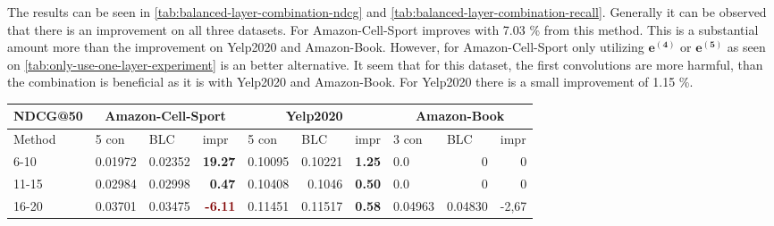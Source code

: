 The results can be seen in \autoref{tab:balanced-layer-combination-ndcg} and \autoref{tab:balanced-layer-combination-recall}.
Generally it can be observed that there is an improvement on all three datasets. %
For Amazon-Cell-Sport improves with 7.03 \% from this method.
This is a substantial amount more than the improvement on Yelp2020 and Amazon-Book.
However, for Amazon-Cell-Sport only utilizing $\mathbf{e^{(4)}}$ or $\mathbf{e^{(5)}}$ as seen on \autoref{tab:only-use-one-layer-experiment} is an better alternative.
It seem that for this dataset, the first convolutions are more harmful, than the combination is beneficial as it is with Yelp2020 and Amazon-Book.
For Yelp2020 there is a small improvement of 1.15 \%.

\begin{table*}[h!] %
    \centering
    \begin{tabular}{|l|r|r|r||l|r|r||l|l|l|}
        \hline
        NDCG@50 & \multicolumn{3}{c||}{Amazon-Cell-Sport} & \multicolumn{3}{c||}{Yelp2020} & \multicolumn{3}{c|}{Amazon-Book}                                                                                                                                                \\ \hline
        Method  & \multicolumn{1}{l|}{5 con}              & \multicolumn{1}{l|}{BLC}       & \multicolumn{1}{l||}{impr}             & 5 con   & \multicolumn{1}{l|}{BLC} & \multicolumn{1}{l||}{impr}            & 3 con   & BLC                    & impr                   \\ \hline
        6-10    & 0.01972                                 & 0.02352                        & \textbf{\textcolor{OliveGreen}{19.27}} & 0.10095 & 0.10221                  & \textbf{\textcolor{OliveGreen}{1.25}} & 0.0     & \multicolumn{1}{r|}{0} & \multicolumn{1}{r|}{0} \\ \hline
        11-15   & 0.02984                                 & 0.02998                        & \textbf{\textcolor{OliveGreen}{0.47}}  & 0.10408 & 0.1046                   & \textbf{\textcolor{OliveGreen}{0.50}} & 0.0     & \multicolumn{1}{r|}{0} & \multicolumn{1}{r|}{0} \\ \hline
        16-20   & 0.03701                                 & 0.03475                        & \textbf{\textcolor{Maroon}{-6.11}}     & 0.11451 & 0.11517                  & \textbf{\textcolor{OliveGreen}{0.58}} & 0.04963 & 0.04830                & -2,67                  \\ \hline

\end{tabular}
\end{table*}
